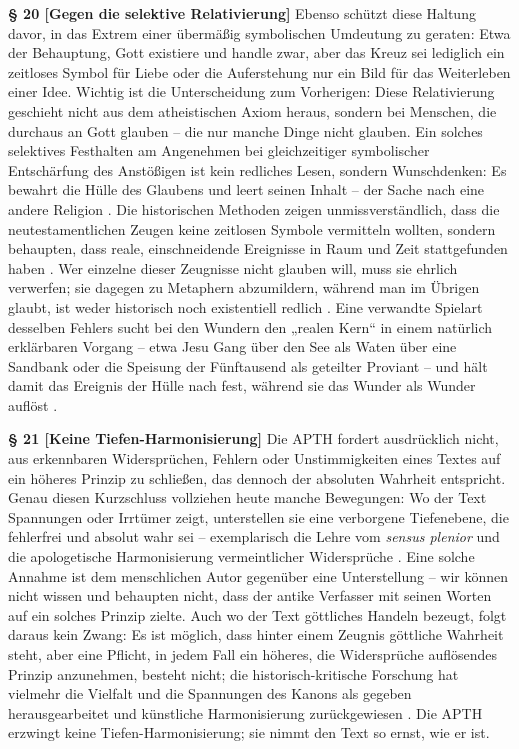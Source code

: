 \documentclass[11pt,a4paper]{article}
\makeatletter
\newcommand{\apth}{{\apthfont APTH}\hspace{0.15em}\xspace}
\newcommand{\apthsec}[3]{%
  \phantomsection%
  \def\@currentlabel{#1}%
  \label{sec:#3}%
  \textbf{§ #1 [#2]}%
}
\makeatother
\begin{document}
\apthsec{20}{Gegen die selektive Relativierung}{selektive-relativierung} Ebenso schützt diese Haltung davor, in das Extrem einer übermäßig symbolischen Umdeutung zu geraten: Etwa der Behauptung, Gott existiere und handle zwar, aber das Kreuz sei lediglich ein zeitloses Symbol für Liebe oder die Auferstehung nur ein Bild für das Weiterleben einer Idee. Wichtig ist die Unterscheidung zum Vorherigen: Diese Relativierung geschieht nicht aus dem atheistischen Axiom heraus, sondern bei Menschen, die durchaus an Gott glauben – die nur manche Dinge nicht glauben. Ein solches selektives Festhalten am Angenehmen bei gleichzeitiger symbolischer Entschärfung des Anstößigen ist kein redliches Lesen, sondern Wunschdenken: Es bewahrt die Hülle des Glaubens und leert seinen Inhalt – der Sache nach eine andere Religion \citep{machen1923}. Die historischen Methoden zeigen unmissverständlich, dass die neutestamentlichen Zeugen keine zeitlosen Symbole vermitteln wollten, sondern behaupten, dass reale, einschneidende Ereignisse in Raum und Zeit stattgefunden haben \citep{wright2003}. Wer einzelne dieser Zeugnisse nicht glauben will, muss sie ehrlich verwerfen; sie dagegen zu Metaphern abzumildern, während man im Übrigen glaubt, ist weder historisch noch existentiell redlich \citep{lewis1967,bultmann1941}. Eine verwandte Spielart desselben Fehlers sucht bei den Wundern den „realen Kern“ in einem natürlich erklärbaren Vorgang – etwa Jesu Gang über den See als Waten über eine Sandbank oder die Speisung der Fünftausend als geteilter Proviant – und hält damit das Ereignis der Hülle nach fest, während sie das Wunder als Wunder auflöst \citep{paulus1828}.

\apthsec{21}{Keine Tiefen-Harmonisierung}{tiefen-harmonisierung} Die \apth fordert ausdrücklich nicht, aus erkennbaren Widersprüchen, Fehlern oder Unstimmigkeiten eines Textes auf ein höheres Prinzip zu schließen, das dennoch der absoluten Wahrheit entspricht. Genau diesen Kurzschluss vollziehen heute manche Bewegungen: Wo der Text Spannungen oder Irrtümer zeigt, unterstellen sie eine verborgene Tiefenebene, die fehlerfrei und absolut wahr sei – exemplarisch die Lehre vom \textit{sensus plenior} \citep{brown1955} und die apologetische Harmonisierung vermeintlicher Widersprüche \citep{archer1982}. Eine solche Annahme ist dem menschlichen Autor gegenüber eine Unterstellung – wir können nicht wissen und behaupten nicht, dass der antike Verfasser mit seinen Worten auf ein solches Prinzip zielte. Auch wo der Text göttliches Handeln bezeugt, folgt daraus kein Zwang: Es ist möglich, dass hinter einem Zeugnis göttliche Wahrheit steht, aber eine Pflicht, in jedem Fall ein höheres, die Widersprüche auflösendes Prinzip anzunehmen, besteht nicht; die historisch-kritische Forschung hat vielmehr die Vielfalt und die Spannungen des Kanons als gegeben herausgearbeitet und künstliche Harmonisierung zurückgewiesen \citep{kaesemann1951,dunn1977,enns2005}. Die \apth erzwingt keine Tiefen-Harmonisierung; sie nimmt den Text so ernst, wie er ist.
\end{document}

